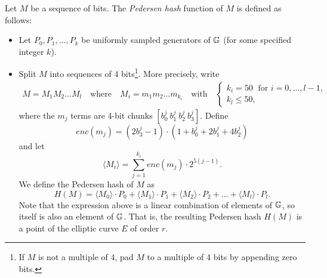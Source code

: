 Let $M$ be a sequence of bits. %
The {\it Pedersen hash} function of $M$ is defined as follows:
\begin{itemize}
	\item Let $P_0,P_1,\dots,P_k$ be uniformly sampled generators of $\mathbb{G}$ (for some specified integer $k$). 
	\item   Split $M$ into sequences of 4 bits{\footnote{If $M$ is not a multiple of 4, pad $M$ to a multiple of 4 bits by appending zero bits.}}. 
	More precisely, write  
	\begin{gather*}
		M = M_1M_2\dots M_l 
		\quad\text{where}\quad
		M_i = m_1m_2\dots m_{k_i}
		\quad\text{with}\quad 
		\begin{cases}
			k_i = 50 	\;\text{ for }  i = 0, \dots, l-1, \\
			k_l \leq 50,
		\end{cases}
	\end{gather*}
	where the $m_j$ terms are 4-bit chunks $[b_0^j\: b_1^j\: b_2^j\: b_3^j]$. 
	Define  
	$$ enc(m_j) = (2b_3^j-1) 
		\cdot (1+b_{0}^j+2b_{1}^j+4b^j_{2}) $$
	and let 
	$$ \langle M_i \rangle = \sum_{j=1}^{k_i} enc(m_j) \cdot 2^{5(j-1)}.	$$
	We define the Pedersen hash of $M$ as
	\begin{equation}
	\label{eq-ped}
		H(M) = \langle M_0 \rangle \cdot P_0 
		+  \langle M_1 \rangle \cdot P_1 
		+  \langle M_2 \rangle \cdot P_2 
		+ \dots + \langle M_l \rangle \cdot P_l.	
	\end{equation}
	Note that the expression above is a linear combination of elements of $\mathbb{G}$, 
	so itself is also an element of $\mathbb{G}$. 
	That is, the resulting Pedersen hash $H(M)$ is a point of the elliptic curve $E$ of order $r$.
\end{itemize}